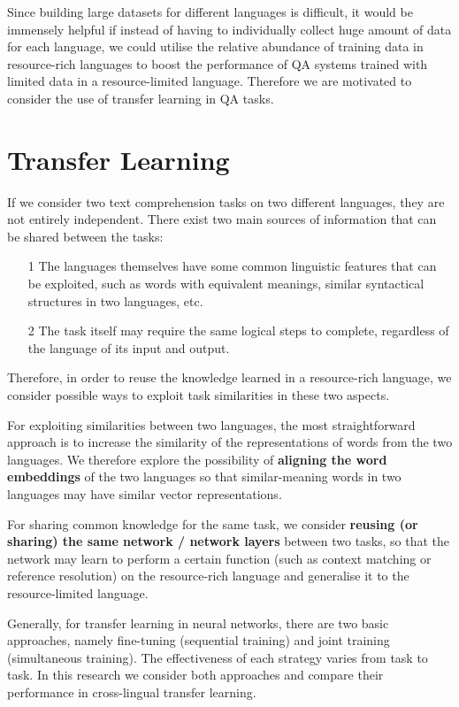 \documentclass[]{article}
\begin{document}
Since building large datasets for different languages is difficult, it would be immensely helpful if instead of having to individually collect huge amount of data for each language, we could utilise the relative abundance of training data in resource-rich languages to boost the performance of QA systems trained with limited data in a resource-limited language. Therefore we are motivated to consider the use of transfer learning in QA tasks.


\section{Transfer Learning}

If we consider two text comprehension tasks on two different languages, they are not entirely independent. There exist two main sources of information that can be shared between the tasks:
\begin{itemize}
	\item[1] The languages themselves have some common linguistic features that can be exploited, such as words with equivalent meanings, similar syntactical structures in two languages, etc.
	\item[2] The task itself may require the same logical steps to complete, regardless of the language of its input and output.
\end{itemize}

Therefore, in order to reuse the knowledge learned in a resource-rich language, we consider possible ways to exploit task similarities in these two aspects.

For exploiting similarities between two languages, the most straightforward approach is to increase the similarity of the representations of words from the two languages. We therefore explore the possibility of \textbf{aligning the word embeddings} of the two languages so that similar-meaning words in two languages may have similar vector representations.

For sharing common knowledge for the same task, we consider \textbf{reusing (or sharing) the same network / network layers} between two tasks, so that the network may learn to perform a certain function (such as context matching or reference resolution) on the resource-rich language and generalise it to the resource-limited language. 

Generally, for transfer learning in neural networks, there are two basic approaches, namely fine-tuning (sequential training) and joint training (simultaneous training). The effectiveness of each strategy varies from task to task. In this research we consider both approaches and compare their performance in cross-lingual transfer learning.
\end{document}
